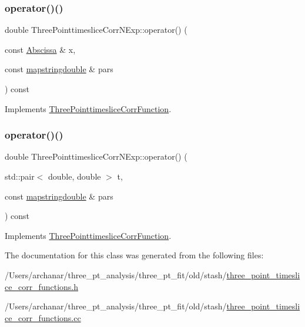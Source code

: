 \subsubsection{\texorpdfstring{operator()()}{operator()()}\hspace{0.1cm}{\footnotesize\ttfamily [3/4]}}
{\footnotesize\ttfamily double Three\+Pointtimeslice\+Corr\+N\+Exp\+::operator() (\begin{DoxyParamCaption}\item[{const \mbox{\hyperlink{classAbscissa}{Abscissa}} \&}]{x,  }\item[{const \mbox{\hyperlink{lib_2fitting__lib_2includes_8h_a647b481c557c7966517f753340a81d13}{mapstringdouble}} \&}]{pars }\end{DoxyParamCaption}) const\hspace{0.3cm}{\ttfamily [virtual]}}



Implements \mbox{\hyperlink{classThreePointtimesliceCorrFunction_af4198f5c0d9085c5dcc8d79447d54348}{Three\+Pointtimeslice\+Corr\+Function}}.

\mbox{\label{classThreePointtimesliceCorrNExp_a32c3a96362aae58e8eb5a5eb8f5aafc9}} 
\subsubsection{\texorpdfstring{operator()()}{operator()()}\hspace{0.1cm}{\footnotesize\ttfamily [4/4]}}
{\footnotesize\ttfamily double Three\+Pointtimeslice\+Corr\+N\+Exp\+::operator() (\begin{DoxyParamCaption}\item[{std\+::pair$<$ double, double $>$}]{t,  }\item[{const \mbox{\hyperlink{lib_2fitting__lib_2includes_8h_a647b481c557c7966517f753340a81d13}{mapstringdouble}} \&}]{pars }\end{DoxyParamCaption}) const\hspace{0.3cm}{\ttfamily [virtual]}}



Implements \mbox{\hyperlink{classThreePointtimesliceCorrFunction_a9d86382fdb47e87d53aea1878abd1da0}{Three\+Pointtimeslice\+Corr\+Function}}.



The documentation for this class was generated from the following files\+:\begin{DoxyCompactItemize}
\item 
/\+Users/archanar/three\+\_\+pt\+\_\+analysis/three\+\_\+pt\+\_\+fit/old/stash/\mbox{\hyperlink{old_2stash_2three__point__timeslice__corr__functions_8h}{three\+\_\+point\+\_\+timeslice\+\_\+corr\+\_\+functions.\+h}}\item 
/\+Users/archanar/three\+\_\+pt\+\_\+analysis/three\+\_\+pt\+\_\+fit/old/stash/\mbox{\hyperlink{old_2stash_2three__point__timeslice__corr__functions_8cc}{three\+\_\+point\+\_\+timeslice\+\_\+corr\+\_\+functions.\+cc}}\end{DoxyCompactItemize}
